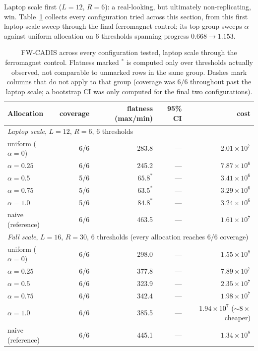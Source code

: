 \documentclass[a4paper,fleqn]{cas-sc}
\begin{document}
	Laptop scale first ($L=12$, $R=6$): a real-looking, but ultimately non-replicating,
	win. Table~\ref{tab:fwall} collects every configuration tried across this section, from
	this first laptop-scale sweep through the final ferromagnet control; its top group sweeps
	$\alpha$ against uniform allocation on 6 thresholds spanning progress $0.668\to1.153$.
	
	\begin{table}[H]
		\centering\small
		\caption{FW-CADIS across every configuration tested, laptop scale through the ferromagnet
			control. Flatness marked $^*$ is computed only over thresholds actually observed, not
			comparable to unmarked rows in the same group. Dashes mark columns that do not apply to
			that group (coverage was 6/6 throughout past the laptop scale; a bootstrap CI was only
			computed for the final two configurations).}
		\label{tab:fwall}
		\begin{tabular}{lrrrr}
			\toprule
			Allocation & coverage & flatness (max/min) & 95\% CI & cost \\
			\midrule
			\multicolumn{5}{l}{\emph{Laptop scale}, $L=12$, $R=6$, 6 thresholds} \\
			uniform ($\alpha=0$) & 6/6 & 283.8 & --- & $2.01\times10^{7}$ \\
			$\alpha=0.25$ & 6/6 & 245.2 & --- & $7.87\times10^{6}$ \\
			$\alpha=0.5$ & 5/6 & $65.8^*$ & --- & $3.41\times10^{6}$ \\
			$\alpha=0.75$ & 5/6 & $63.5^*$ & --- & $3.29\times10^{6}$ \\
			$\alpha=1.0$ & 5/6 & $84.8^*$ & --- & $3.24\times10^{6}$ \\
			naive (reference) & 6/6 & 463.5 & --- & $1.61\times10^{7}$ \\
			\multicolumn{5}{l}{\emph{Full scale}, $L=16$, $R=30$, 6 thresholds (every allocation reaches 6/6 coverage)} \\
			uniform ($\alpha=0$) & 6/6 & 298.0 & --- & $1.55\times10^{8}$ \\
			$\alpha=0.25$ & 6/6 & 377.8 & --- & $7.89\times10^{7}$ \\
			$\alpha=0.5$ & 6/6 & 323.9 & --- & $2.35\times10^{7}$ \\
			$\alpha=0.75$ & 6/6 & 342.4 & --- & $1.98\times10^{7}$ \\
			$\alpha=1.0$ & 6/6 & 385.5 & --- & $1.94\times10^{7}$ ($\sim\!8\times$ cheaper) \\
			naive (reference) & 6/6 & 445.1 & --- & $1.34\times10^{8}$ \\

\end{tabular}
\end{table}
\end{document}
